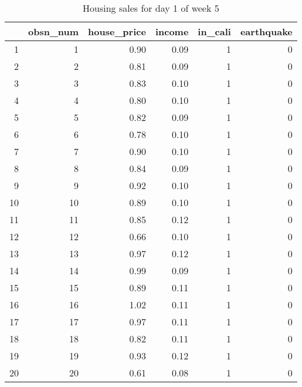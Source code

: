 \begin{table}[ht]
\centering
\begin{tabular}{rrrrrr}
  \hline
 & obsn\_num & house\_price & income & in\_cali & earthquake \\ 
  \hline
1 &   1 & 0.90 & 0.09 &   1 &   0 \\ 
  2 &   2 & 0.81 & 0.09 &   1 &   0 \\ 
  3 &   3 & 0.83 & 0.10 &   1 &   0 \\ 
  4 &   4 & 0.80 & 0.10 &   1 &   0 \\ 
  5 &   5 & 0.82 & 0.09 &   1 &   0 \\ 
  6 &   6 & 0.78 & 0.10 &   1 &   0 \\ 
  7 &   7 & 0.90 & 0.10 &   1 &   0 \\ 
  8 &   8 & 0.84 & 0.09 &   1 &   0 \\ 
  9 &   9 & 0.92 & 0.10 &   1 &   0 \\ 
  10 &  10 & 0.89 & 0.10 &   1 &   0 \\ 
  11 &  11 & 0.85 & 0.12 &   1 &   0 \\ 
  12 &  12 & 0.66 & 0.10 &   1 &   0 \\ 
  13 &  13 & 0.97 & 0.12 &   1 &   0 \\ 
  14 &  14 & 0.99 & 0.09 &   1 &   0 \\ 
  15 &  15 & 0.89 & 0.11 &   1 &   0 \\ 
  16 &  16 & 1.02 & 0.11 &   1 &   0 \\ 
  17 &  17 & 0.97 & 0.11 &   1 &   0 \\ 
  18 &  18 & 0.82 & 0.11 &   1 &   0 \\ 
  19 &  19 & 0.93 & 0.12 &   1 &   0 \\ 
  20 &  20 & 0.61 & 0.08 &   1 &   0 \\ 
   \hline
\end{tabular}
\caption{Housing sales for day 1 of week 5} 
\end{table}
